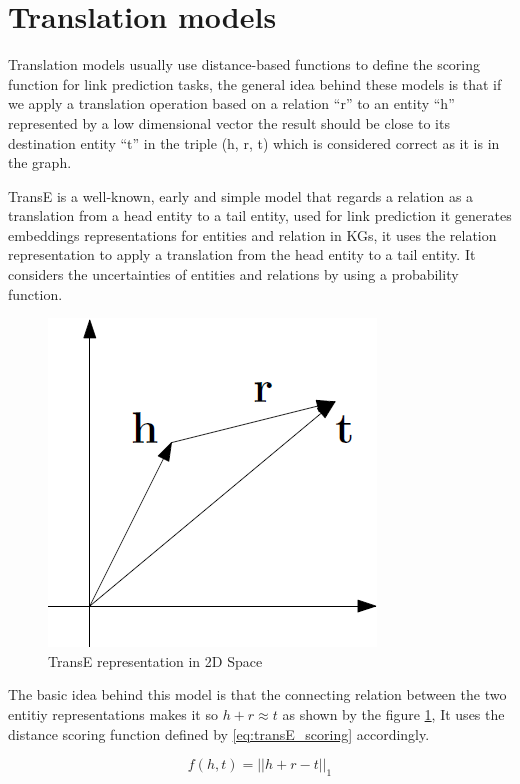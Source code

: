 \section{Translation models}\label{sec:emb-translations}


Translation models usually use distance-based functions to define the scoring function for link prediction tasks, the general idea behind these models is that if we apply a translation operation based on a relation ``r'' to an entity ``h'' represented by a low dimensional vector the result should be close to its destination entity ``t'' in the triple (h, r, t) which is considered correct as it is in the graph.

TransE \cite{} is a well-known, early and simple model that regards a relation as a translation from a head entity to a tail entity, used for link prediction it generates embeddings representations for entities and relation in KGs, it uses the relation representation to apply a translation from the head entity to a tail entity. It considers the uncertainties of entities and relations by using a probability function. 

\begin{figure}[!htp]
    \centering
    \includegraphics[width=.4\textwidth]{fig/embeddings/TransE.png}
    \caption{TransE representation in 2D Space}
    \label{fig:emb-transE}
\end{figure}

The basic idea behind this model is that the connecting relation between the two entitiy representations makes it so  $h + r \approx t$ as shown by the figure \ref{fig:emb-transE}, It uses the distance scoring function defined by \ref{eq:transE_scoring} accordingly.

\begin{equation}
    \label{eq:transE_scoring}
    f (h, t) = ||h + r - t||_1
\end{equation}
    

